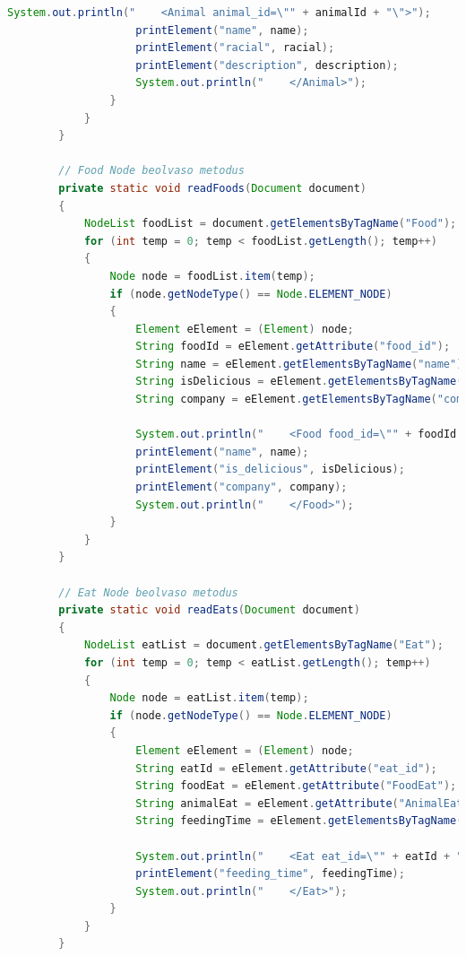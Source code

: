 \documentclass[12pt]{report}
\begin{document}
\begin{lstlisting}[caption={DOMReadKLNSPG.java} olvasó program, language=Java]
					System.out.println("    <Animal animal_id=\"" + animalId + "\">");
					printElement("name", name);
					printElement("racial", racial);
					printElement("description", description);
					System.out.println("    </Animal>");
				}
			}
		}
		
		// Food Node beolvaso metodus
		private static void readFoods(Document document) 
		{
			NodeList foodList = document.getElementsByTagName("Food");
			for (int temp = 0; temp < foodList.getLength(); temp++) 
			{
				Node node = foodList.item(temp);
				if (node.getNodeType() == Node.ELEMENT_NODE) 
				{
					Element eElement = (Element) node;
					String foodId = eElement.getAttribute("food_id");
					String name = eElement.getElementsByTagName("name").item(0).getTextContent();
					String isDelicious = eElement.getElementsByTagName("is_delicious").item(0).getTextContent();
					String company = eElement.getElementsByTagName("company").item(0).getTextContent();
					
					System.out.println("    <Food food_id=\"" + foodId + "\">");
					printElement("name", name);
					printElement("is_delicious", isDelicious);
					printElement("company", company);
					System.out.println("    </Food>");
				}
			}
		}
		
		// Eat Node beolvaso metodus
		private static void readEats(Document document) 
		{
			NodeList eatList = document.getElementsByTagName("Eat");
			for (int temp = 0; temp < eatList.getLength(); temp++) 
			{
				Node node = eatList.item(temp);
				if (node.getNodeType() == Node.ELEMENT_NODE) 
				{
					Element eElement = (Element) node;
					String eatId = eElement.getAttribute("eat_id");
					String foodEat = eElement.getAttribute("FoodEat");
					String animalEat = eElement.getAttribute("AnimalEat");
					String feedingTime = eElement.getElementsByTagName("feeding_time").item(0).getTextContent();
					
					System.out.println("    <Eat eat_id=\"" + eatId + "\" FoodEat=\"" + foodEat + "\" AnimalEat=\"" + animalEat + "\">");
					printElement("feeding_time", feedingTime);
					System.out.println("    </Eat>");
				}
			}
		}
		

\end{lstlisting}
\end{document}
